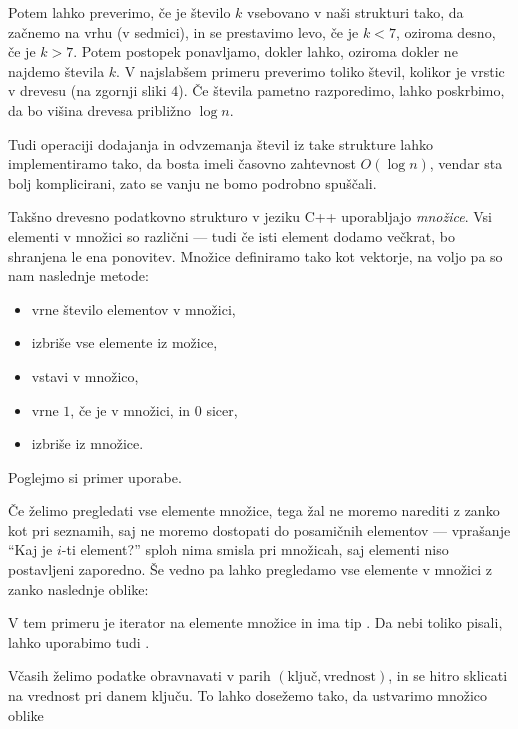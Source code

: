 Potem lahko preverimo, če je število $k$ vsebovano v naši strukturi tako, da
začnemo na vrhu (v sedmici), in se prestavimo levo, če je $k < 7$, oziroma
desno, če je $k > 7$.
Potem postopek ponavljamo, dokler lahko, oziroma dokler ne najdemo števila $k$.
V najslabšem primeru preverimo toliko števil, kolikor je vrstic v drevesu (na
zgornji sliki $4$).
Če števila pametno razporedimo, lahko poskrbimo, da bo višina drevesa približno
$\log n$.

Tudi operaciji dodajanja in odvzemanja števil iz take strukture lahko
implementiramo tako, da bosta imeli časovno zahtevnost $O(\log n)$, vendar sta
bolj komplicirani, zato se vanju ne bomo podrobno spuščali.

Takšno drevesno podatkovno strukturo v jeziku C++ uporabljajo \emph{množice}.
Vsi elementi v množici so različni --- tudi če isti element dodamo večkrat, bo
shranjena le ena ponovitev.
Množice definiramo tako kot vektorje, na voljo pa so nam naslednje metode:
\begin{itemize}
\item {} vrne število elementov v množici,
\item {} izbriše vse elemente iz možice,
\item {} vstavi  v množico,
\item {} vrne $1$, če je  v množici, in $0$ sicer,
\item {} izbriše  iz množice.
\end{itemize}
Poglejmo si primer uporabe.


Če želimo pregledati vse elemente množice, tega žal ne moremo narediti z zanko
kot pri seznamih, saj ne moremo dostopati do posamičnih elementov --- vprašanje
\enquote{Kaj je $i$-ti element?} sploh nima smisla pri množicah, saj elementi
niso postavljeni zaporedno.
Še vedno pa lahko pregledamo vse elemente v množici z zanko naslednje oblike:


V tem primeru je  iterator na elemente množice in ima tip
.
Da nebi toliko pisali, lahko uporabimo tudi .


Včasih želimo podatke obravnavati v parih $(\text{ključ}, \text{vrednost})$,
in se hitro sklicati na vrednost pri danem ključu.
To lahko dosežemo tako, da ustvarimo množico oblike

